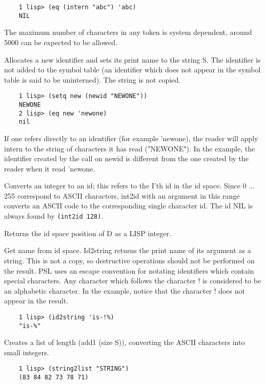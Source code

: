 \begin{verbatim}
    1 lisp> (eq (intern "abc") 'abc)
    NIL
\end{verbatim}
    The maximum number of characters in any token is system dependent,
around 5000 can be expected to be allowed.


{    Allocates a new identifier and sets its print  name  to  the
    string  S.   The identifier is not added to the symbol table
    (an identifier which does not appear in the symbol table  is
    said to be uninterned).  The string is not copied.
}
\begin{verbatim}
    1 lisp> (setq new (newid "NEWONE"))
    NEWONE
    2 lisp> (eq new 'newone)
    nil
\end{verbatim}
    If  one  refers  directly  to  an  identifier  (for  example
    'newone), the reader will apply  intern  to  the  string  of
    characters  it  has  read  ("NEWONE").   In the example, the
    identifier created by the call on newid  is  different  from
    the one created by the reader when it read 'newone.

{    Converts  an integer to an id; this refers to the I'th id in
    the id space. Since  0  ...  255  correspond  to  ASCII
    characters,  int2id  with an argument in this range converts
    an ASCII code to the corresponding single character id.
    The id NIL is always found by {\tt (int2id 128)}.  }

{    Returns the id space position of D as a LISP integer.  }

{    Get name from id space.  Id2string returns the print name of
    its  argument  as  a  string.    This  is  not  a  copy,  so
    destructive  operations  should  not  be  performed  on  the
    result.    PSL  uses  an  escape  convention  for   notating
    identifiers which contain special characters.  Any character
    which  follows  the  character  !  is  considered  to  be an
    alphabetic character.   In  the  example,  notice  that  the
    character ! does not appear in the result.  }
\begin{verbatim}
    1 lisp> (id2string 'is-!%)
    "is-%"
\end{verbatim}
{    Creates  a  list  of length  (add1 (size S)), converting the
    ASCII characters into small integers.
}
\begin{verbatim}
    1 lisp> (string2list "STRING")
    (83 84 82 73 78 71)
\end{verbatim}


